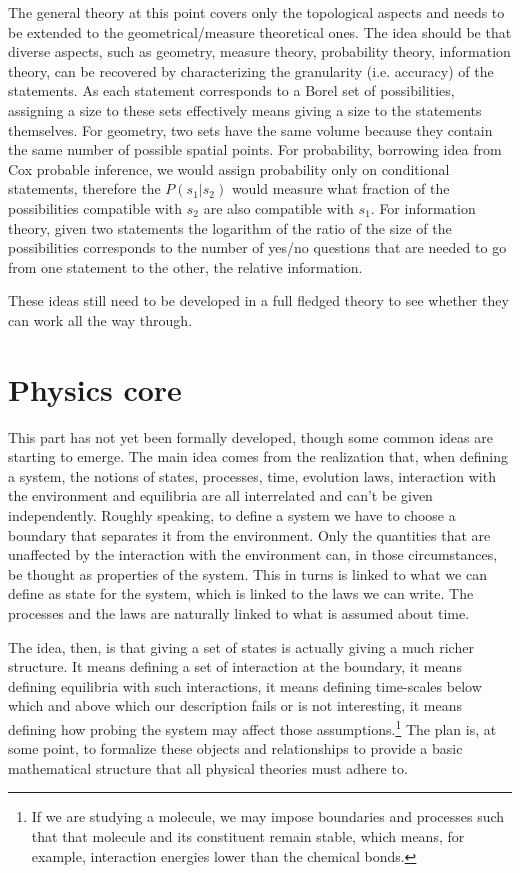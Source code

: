 \documentclass[twocolumn]{article}
\begin{document}
The general theory at this point covers only the topological aspects and needs to be extended to the geometrical/measure theoretical ones. The idea should be that diverse aspects, such as geometry, measure theory, probability theory, information theory, can be recovered by characterizing the granularity (i.e. accuracy) of the statements. As each statement corresponds to a Borel set of possibilities, assigning a size to these sets effectively means giving a size to the statements themselves. For geometry, two sets have the same volume because they contain the same number of possible spatial points. For probability, borrowing idea from Cox probable inference, we would assign probability only on conditional statements, therefore the $P(s_1 | s_2)$ would measure what fraction of the possibilities compatible with $s_2$ are also compatible with $s_1$. For information theory, given two statements the logarithm of the ratio of the size of the possibilities corresponds to the number of yes/no questions that are needed to go from one statement to the other, the relative information.

These ideas still need to be developed in a full fledged theory to see whether they can work all the way through.

\section{Physics core}

This part has not yet been formally developed, though some common ideas are starting to emerge. The main idea comes from the realization that, when defining a system, the notions of states, processes, time, evolution laws, interaction with the environment and equilibria are all interrelated and can't be given independently. Roughly speaking, to define a system we have to choose a boundary that separates it from the environment. Only the quantities that are unaffected by the interaction with the environment can, in those circumstances, be thought as properties of the system. This in turns is linked to what we can define as state for the system, which is linked to the laws we can write. The processes and the laws are naturally linked to what is assumed about time.

The idea, then, is that giving a set of states is actually giving a much richer structure. It means defining a set of interaction at the boundary, it means defining equilibria with such interactions, it means defining time-scales below which and above which our description fails or is not interesting, it means defining how probing the system may affect those assumptions.\footnote{If we are studying a molecule, we may impose boundaries and processes such that that molecule and its constituent remain stable, which means, for example, interaction energies lower than the chemical bonds.} The plan is, at some point, to formalize these objects and relationships to provide a basic mathematical structure that all physical theories must adhere to.
\end{document}
